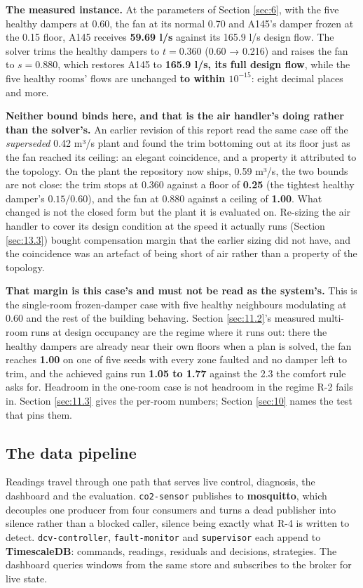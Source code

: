 \textbf{The measured instance.} At the parameters of Section \ref{sec:6}, with the five healthy dampers at
0.60, the fan at its normal 0.70 and A145's damper frozen at the 0.15 floor, A145 receives
\textbf{59.69 l/s} against its 165.9 l/s design flow. The solver trims the healthy dampers to
$t = 0.360$ (0.60 → 0.216) and raises the fan to $s = 0.880$, which restores A145 to
\textbf{165.9 l/s, its full design flow}, while the five healthy rooms' flows are unchanged
\textbf{to within $10^{-15}$}: eight decimal places and more.

\textbf{Neither bound binds here, and that is the air handler's doing rather than the solver's.}
An earlier revision of this report read the same case off the \emph{superseded} 0.42 m³/s plant and
found the trim bottoming out at its floor just as the fan reached its ceiling: an elegant
coincidence, and a property it attributed to the topology. On the plant the repository now ships,
0.59 m³/s, the two bounds are not close: the trim stops at 0.360 against a floor of \textbf{0.25}
(the tightest healthy damper's $0.15/0.60$), and the fan at 0.880 against a ceiling of
\textbf{1.00}. What changed is not the closed form but the plant it is evaluated on. Re-sizing the
air handler to cover its design condition at the speed it actually runs (Section \ref{sec:13.3}) bought
compensation margin that the earlier sizing did not have, and the coincidence was an artefact of
being short of air rather than a property of the topology.

\textbf{That margin is this case's and must not be read as the system's.} This is the single-room
frozen-damper case with five healthy neighbours modulating at 0.60 and the rest of the building
behaving. Section \ref{sec:11.2}'s measured multi-room runs at design occupancy are the regime where it runs
out: there the healthy dampers are already near their own floors when a plan is solved, the fan
reaches \textbf{1.00} on one of five seeds with every zone faulted and no damper left to trim, and
the achieved gains run \textbf{1.05 to 1.77} against the 2.3 the comfort rule asks for. Headroom in
the one-room case is not headroom in the regime R-2 fails in. Section \ref{sec:11.3} gives the per-room
numbers; Section \ref{sec:10} names the test that pins them.

\subsection{The data pipeline}\label{sec:7.5}

Readings travel through one path that serves live control, diagnosis, the dashboard and the
evaluation. \texttt{co2-sensor} publishes to \textbf{mosquitto}, which decouples one producer from
four consumers and turns a dead publisher into silence rather than a blocked caller, silence being
exactly what R-4 is written to detect. \texttt{dcv-controller}, \texttt{fault-monitor} and
\texttt{supervisor} each append to \textbf{TimescaleDB}: commands, readings, residuals and
decisions, strategies. The dashboard queries windows from the same store and subscribes to the
broker for live state.

